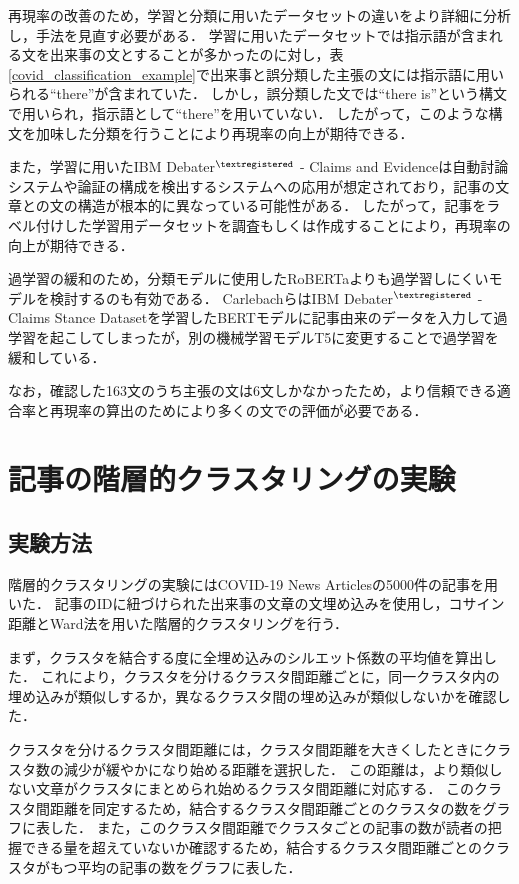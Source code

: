 \documentclass[12pt,a4j]{jreport}
\begin{document}
再現率の改善のため，学習と分類に用いたデータセットの違いをより詳細に分析し，手法を見直す必要がある．
学習に用いたデータセットでは指示語が含まれる文を出来事の文とすることが多かったのに対し，表\ref{covid_classification_example}で出来事と誤分類した主張の文には指示語に用いられる``there''が含まれていた．
しかし，誤分類した文では``there is''という構文で用いられ，指示語として``there''を用いていない．
したがって，このような構文を加味した分類を行うことにより再現率の向上が期待できる．

また，学習に用いたIBM Debater$^{\textregistered}$ - Claims and Evidenceは自動討論システムや論証の構成を検出するシステムへの応用が想定されており，記事の文章との文の構造が根本的に異なっている可能性がある．
したがって，記事をラベル付けした学習用データセットを調査もしくは作成することにより，再現率の向上が期待できる．

過学習の緩和のため，分類モデルに使用したRoBERTaよりも過学習しにくいモデルを検討するのも有効である．
CarlebachらはIBM Debater$^{\textregistered}$ - Claims Stance Datasetを学習したBERTモデルに記事由来のデータを入力して過学習を起こしてしまったが，別の機械学習モデルT5に変更することで過学習を緩和している\cite{carlebach_news_2020}．

なお，確認した163文のうち主張の文は6文しかなかったため，より信頼できる適合率と再現率の算出のためにより多くの文での評価が必要である．


\section{記事の階層的クラスタリングの実験}
\label{section_article_clustering_experiment}

\subsection{実験方法}

階層的クラスタリングの実験にはCOVID-19 News Articlesの5000件の記事を用いた．
記事のIDに紐づけられた出来事の文章の文埋め込みを使用し，コサイン距離とWard法を用いた階層的クラスタリングを行う．

まず，クラスタを結合する度に全埋め込みのシルエット係数の平均値を算出した．
これにより，クラスタを分けるクラスタ間距離ごとに，同一クラスタ内の埋め込みが類似しするか，異なるクラスタ間の埋め込みが類似しないかを確認した．

クラスタを分けるクラスタ間距離には，クラスタ間距離を大きくしたときにクラスタ数の減少が緩やかになり始める距離を選択した．
この距離は，より類似しない文章がクラスタにまとめられ始めるクラスタ間距離に対応する．
このクラスタ間距離を同定するため，結合するクラスタ間距離ごとのクラスタの数をグラフに表した．
また，このクラスタ間距離でクラスタごとの記事の数が読者の把握できる量を超えていないか確認するため，結合するクラスタ間距離ごとのクラスタがもつ平均の記事の数をグラフに表した．
\end{document}
